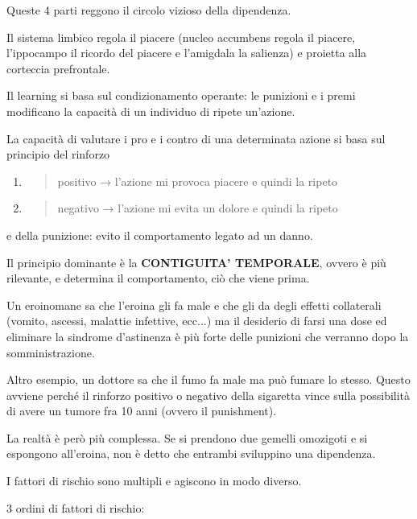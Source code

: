 \documentclass[]{article}
\begin{document}
Queste 4 parti reggono il circolo vizioso della dipendenza.

Il sistema limbico regola il piacere (nucleo accumbens regola il
piacere, l'ippocampo il ricordo del piacere e l'amigdala la salienza) e
proietta alla corteccia prefrontale.

Il learning si basa sul condizionamento operante: le punizioni e i premi
modificano la capacità di un individuo di ripete un'azione.

La capacità di valutare i pro e i contro di una determinata azione si
basa sul principio del rinforzo

\begin{enumerate}
\def\labelenumi{\arabic{enumi}.}
\item
  \begin{quote}
  positivo → l'azione mi provoca piacere e quindi la ripeto
  \end{quote}
\item
  \begin{quote}
  negativo → l'azione mi evita un dolore e quindi la ripeto
  \end{quote}
\end{enumerate}

e della punizione: evito il comportamento legato ad un danno.

Il principio dominante è la \textbf{CONTIGUITA' TEMPORALE}, ovvero è più
rilevante, e determina il comportamento, ciò che viene prima.

Un eroinomane sa che l'eroina gli fa male e che gli da degli effetti
collaterali (vomito, ascessi, malattie infettive, ecc...) ma il
desiderio di farsi una dose ed eliminare la sindrome d'astinenza è più
forte delle punizioni che verranno dopo la somministrazione.

Altro esempio, un dottore sa che il fumo fa male ma può fumare lo
stesso. Questo avviene perché il rinforzo positivo o negativo della
sigaretta vince sulla possibilità di avere un tumore fra 10 anni (ovvero
il punishment).

La realtà è però più complessa. Se si prendono due gemelli omozigoti e
si espongono all'eroina, non è detto che entrambi sviluppino una
dipendenza.

I fattori di rischio sono multipli e agiscono in modo diverso.

3 ordini di fattori di rischio:
\end{document}
